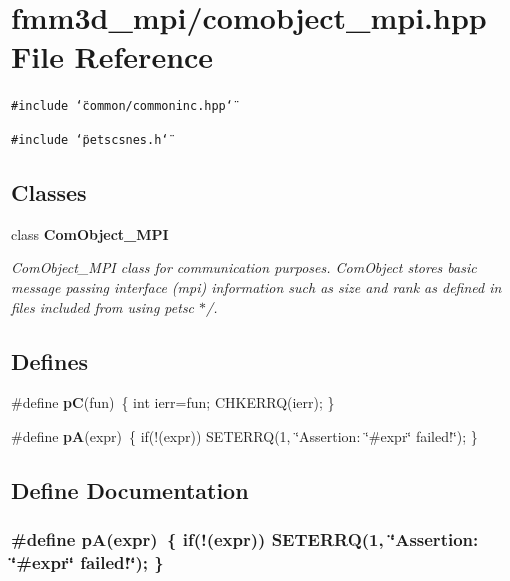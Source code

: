 \section{fmm3d\_\-mpi/comobject\_\-mpi.hpp File Reference}
\label{comobject__mpi_8hpp}


{\tt \#include \char`\"{}common/commoninc.hpp\char`\"{}}\par
{\tt \#include \char`\"{}petscsnes.h\char`\"{}}\par
\subsection*{Classes}
\begin{CompactItemize}
\item 
class {\bf Com\-Object\_\-MPI}
\begin{CompactList}\small\item\em Com\-Object\_\-MPI class for communication purposes. Com\-Object stores basic message passing interface (mpi) information such as size and rank as defined in files included from using petsc $\ast$/. \item\end{CompactList}\end{CompactItemize}
\subsection*{Defines}
\begin{CompactItemize}
\item 
\#define {\bf p\-C}(fun)~\{ int ierr=fun; CHKERRQ(ierr); \}
\item 
\#define {\bf p\-A}(expr)~\{ if(!(expr)) SETERRQ(1, \char`\"{}Assertion: \char`\"{}\#expr\char`\"{} failed!\char`\"{}); \}
\end{CompactItemize}


\subsection{Define Documentation}
\subsubsection{\setlength{\rightskip}{0pt plus 5cm}\#define p\-A(expr)~\{ if(!(expr)) SETERRQ(1, \char`\"{}Assertion: \char`\"{}\#expr\char`\"{} failed!\char`\"{}); \}}\label{comobject__mpi_8hpp_93b69b310934f98d76197daeb3bd62cc_93b69b310934f98d76197daeb3bd62cc}


